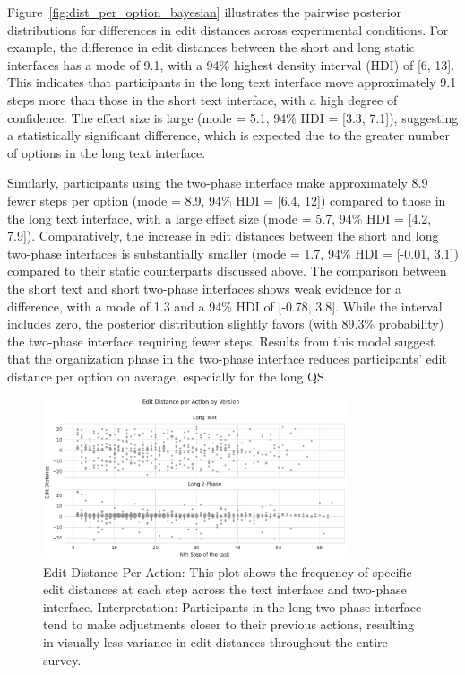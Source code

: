 Figure~\ref{fig:dist_per_option_bayesian} illustrates the pairwise posterior distributions for differences in edit distances across experimental conditions. For example, the difference in edit distances between the short and long static interfaces has a mode of 9.1, with a 94\% highest density interval (HDI) of [6, 13]. This indicates that participants in the long text interface move approximately 9.1 steps more than those in the short text interface, with a high degree of confidence. The effect size is large (mode = 5.1, 94\% HDI = [3.3, 7.1]), suggesting a statistically significant difference, which is expected due to the greater number of options in the long text interface.

Similarly, participants using the two-phase interface make approximately 8.9 fewer steps per option (mode = 8.9, 94\% HDI = [6.4, 12]) compared to those in the long text interface, with a large effect size (mode = 5.7, 94\% HDI = [4.2, 7.9]). Comparatively, the increase in edit distances between the short and long two-phase interfaces is substantially smaller (mode = 1.7, 94\% HDI = [-0.01, 3.1]) compared to their static counterparts discussed above. The comparison between the short text and short two-phase interfaces shows weak evidence for a difference, with a mode of 1.3 and a 94\% HDI of [-0.78, 3.8]. While the interval includes zero, the posterior distribution slightly favors (with 89.3\% probability) the two-phase interface requiring fewer steps. Results from this model suggest that the organization phase in the two-phase interface reduces participants' edit distance per option on average, especially for the long QS.

\begin{figure}[h]
    \centering
    \includegraphics[width=0.8\textwidth]{content/image/distance/edit_distance_per_action_by_version.pdf}
    \caption{Edit Distance Per Action: This plot shows the frequency of specific edit distances at each step across the text interface and two-phase interface. Interpretation: Participants in the long two-phase interface tend to make adjustments closer to their previous actions, resulting in visually less variance in edit distances throughout the entire survey.}
    \label{fig:step-over-distance}
\end{figure}

